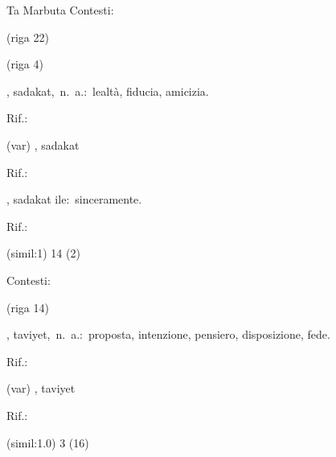 \begin{glossario}{Ta Marbuta}
Contesti:
\begin{subvocedue}
\item[(riga 22)] 
\item[(riga 4)] 
\end{subvocedue}
\item[{\color{colorlowref}\spzrl{.sadAqat}},] {\sf sadakat},\ n.\ a.:\ lealtà, fiducia, amicizia.
\begin{subvocedue}
\item[Rif.:] 
\end{subvocedue}
\begin{subvocedue}
\item[(var)] , {\sf sadakat}\begin{subvocedue}
\item[Rif.:] 
\end{subvocedue}
\item[\subglossariobullet] , {\sf sadakat ile}:\ sinceramente.
\begin{subvocedue}
\item[Rif.:] 
\end{subvocedue}
\item[(simil:1)]   14 (2)
\end{subvocedue}


Contesti:
\begin{subvocedue}
\item[(riga 14)] 
\end{subvocedue}
\item[{\color{colorlowref}\spzrl{.tawIyat}},] {\sf taviyet},\ n.\ a.:\ proposta,    intenzione,    pensiero, disposizione, fede.
\begin{subvocedue}
\item[Rif.:] 
\end{subvocedue}
\begin{subvocedue}
\item[(var)] , {\sf taviyet}\begin{subvocedue}
\item[Rif.:] 
\end{subvocedue}
\item[(simil:1.0)]   3 (16)
\end{subvocedue}



\end{glossario}

